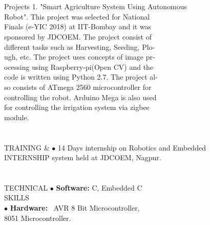 \documentclass[10pt]{article}
\begin{document}
\begin{flushleft}
	\indent \\
	\indent \\
	\indent Projects \hspace{1.1in}1. "Smart Agriculture System Using Autonomous\\ 
	\indent \hspace {1.85in}Robot". This project was selected for National \\
	\indent \hspace {1.8in}  Finals (e-YIC 2018) at IIT-Bombay and it was \\
	\indent \hspace {1.8in}  sponsored by JDCOEM. The project consist of \\
	\indent \hspace {1.8in}  different tasks such as Harvesting, Seeding, Plo-\\
	\indent \hspace {1.82in}  ugh, etc. The project uses concepts of image pr-\\
	\indent \hspace {1.8in} ocessing using Raspberry-pi(Open CV) and the \\
	\indent \hspace {1.79in}   code is written using Python 2.7. The project al-\\
	\indent \hspace {1.79in}  so consists  of ATmega 2560 microcontroller for \\
	\indent \hspace {1.78in}   controlling  the robot. Arduino Mega is also used \\
	\indent \hspace {1.8in}   for controlling the irrigation system via zigbee \\
	\indent \hspace {1.78in} module.\\
	
	\indent\\

	\indent \\
	\indent TRAINING \& \hspace{0.74in}$\bullet$ 14 Days internship on Robotics and Embedded\\
	\indent INTERNSHIP\hspace {0.9in} system  held at JDCOEM, Nagpur.\\
	
	\indent \\ %
	\indent \\	

	\indent TECHNICAL \hspace{0.79in}$\bullet$ \textbf{Software:} C, Embedded C\\ \indent SKILLS \hspace{1.25in}\\
	\indent   \hspace{1.70in}$\bullet$ \textbf{Hardware:} \ AVR 8 Bit Microcontroller, \\
	 \indent \hspace {1.78in} 8051 Microcontroller. \\


\end{flushleft}
\end{document}
